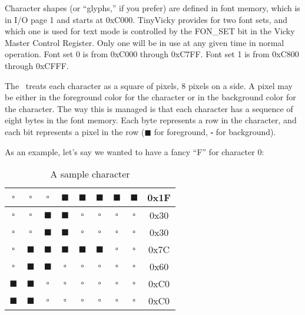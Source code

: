 Character shapes (or ``glyphs,'' if you prefer) are defined in font memory, which is in I/O page 1 and starts at 0xC000. TinyVicky provides for two font sets, and which one is used for text mode is controlled by the FON\_SET bit in the Vicky Master Control Register. Only one will be in use at any given time in normal operation. Font set 0 is from 0xC000 through 0xC7FF. Font set 1 is from 0xC800 through 0xCFFF.

The \jr\ treats each character as a square of pixels, 8 pixels on a side. A pixel may be either in the foreground color for the character or in the background color for the character. The way this is managed is that each character has a sequence of eight bytes in the font memory. Each byte represents a row in the character, and each bit represents a pixel in the row ($\blacksquare$ for foreground, $\square$ for background).

As an example, let's say we wanted to have a fancy ``F'' for character 0:

\begin{table}[ht]
    \begin{center}
        \begin{tabular}{|c|c|c|c|c|c|c|c|c|} \hline
            $\square$ & $\square$ & $\square$ & $\blacksquare$ & $\blacksquare$ & $\blacksquare$ & $\blacksquare$ & $\blacksquare$ & 0x1F \\ \hline
            $\square$ & $\square$ & $\blacksquare$ & $\blacksquare$ & $\square$ & $\square$ & $\square$ & $\square$ & 0x30 \\ \hline
            $\square$ & $\square$ & $\blacksquare$ & $\blacksquare$ & $\square$ & $\square$ & $\square$ & $\square$ & 0x30 \\ \hline
            $\square$ & $\blacksquare$ & $\blacksquare$ & $\blacksquare$ & $\blacksquare$ & $\blacksquare$ & $\square$ & $\square$ & 0x7C \\ \hline
            $\square$ & $\blacksquare$ & $\blacksquare$ & $\square$ & $\square$ & $\square$ & $\square$ & $\square$ & 0x60 \\ \hline
            $\blacksquare$ & $\blacksquare$ & $\square$ & $\square$ & $\square$ & $\square$ & $\square$ & $\square$ & 0xC0 \\ \hline
            $\blacksquare$ & $\blacksquare$ & $\square$ & $\square$ & $\square$ & $\square$ & $\square$ & $\square$ & 0xC0 \\ \hline
        \end{tabular}
    \end{center}
    \caption{A sample character}
    \label{tab:text_font}
\end{table}

